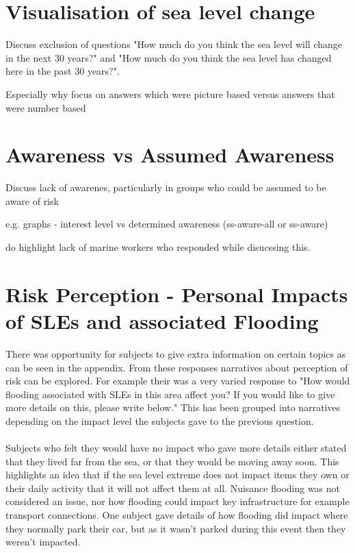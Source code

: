\section{Visualisation of sea level change}
Discuss exclusion of questions "How much do you think the sea level will change in the next 30 years?" and "How much do you think the sea level has changed here in the past 30 years?". 

Especially why focus on answers which were picture based versus answers that were number based



\section{Awareness vs Assumed Awareness}
Discuss lack of awarenes, particularly in groups who could be assumed to be aware of risk

e.g. graphs - interest level vs determined awareness (ss-aware-all or ss-aware)

do highlight lack of marine workers who responded while disucssing this. 

\section{Risk Perception - Personal Impacts of SLEs and associated Flooding}
There was opportunity for subjects to give extra information on certain topics as can be seen in the appendix. From these responses narratives about perception of risk can be explored. For example their was a very varied response to "How would flooding associated with SLEs in this area affect you? If you would like to give more details on this, please write below." This has been grouped into narratives depending on the impact level the subjects gave to the previous question.
\paragraph{}

Subjects who felt they would have no impact who gave more details either stated that they lived far from the sea, or that they would be moving away soon. This highlights an idea that if the sea level extreme does not impact items they own or their daily activity that it will not affect them at all. Nuisance flooding was not considered an issue, nor how flooding could impact key infrastructure for example transport connections. One subject gave details of how flooding did impact where they normally park their car, but as it wasn't parked during this event then they weren't impacted. 
